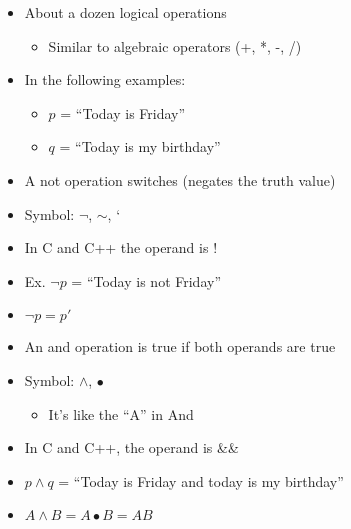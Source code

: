 \begin{itemize}

  \item About a dozen logical operations

    \begin{itemize}

      \item Similar to algebraic operators (+, *, -, /)

    \end{itemize}

  \item In the following examples:

    \begin{itemize}

      \item $p$ = ``Today is Friday''

      \item $q$ = ``Today is my birthday''

    \end{itemize}

  \item A not operation switches (negates the truth value)

  \item Symbol: $\neg$, $\sim$, `

  \item In C and C++ the operand is !

  \item Ex. $\neg p$ = ``Today is not Friday''

  \item $\neg p=p'$

  \item An and operation is true if both operands are true

  \item Symbol: $\wedge$, $\bullet$

    \begin{itemize}

      \item It's like the ``A'' in And

    \end{itemize}

  \item In C and C++, the operand is \&\&

  \item $p\wedge q$ = ``Today is Friday and today is my birthday''

  \item $A\wedge B=A\bullet B=AB$


\end{itemize}
